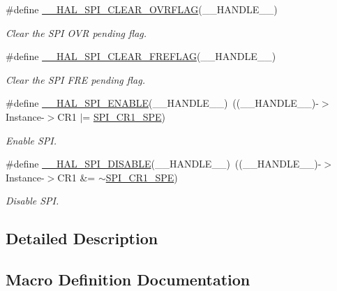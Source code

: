 \begin{DoxyCompactItemize}
\#define \hyperlink{group___s_p_i___exported___macros_gaf6af33b1c5d334b9fe7bb778c5b6442e}{\+\_\+\+\_\+\+H\+A\+L\+\_\+\+S\+P\+I\+\_\+\+C\+L\+E\+A\+R\+\_\+\+O\+V\+R\+F\+L\+AG}(\+\_\+\+\_\+\+H\+A\+N\+D\+L\+E\+\_\+\+\_\+)
\begin{DoxyCompactList}\small\item\em Clear the S\+PI O\+VR pending flag. \end{DoxyCompactList}\item 
\#define \hyperlink{group___s_p_i___exported___macros_ga7ff182f5cf6c731318c882351d6d7ac2}{\+\_\+\+\_\+\+H\+A\+L\+\_\+\+S\+P\+I\+\_\+\+C\+L\+E\+A\+R\+\_\+\+F\+R\+E\+F\+L\+AG}(\+\_\+\+\_\+\+H\+A\+N\+D\+L\+E\+\_\+\+\_\+)
\begin{DoxyCompactList}\small\item\em Clear the S\+PI F\+RE pending flag. \end{DoxyCompactList}\item 
\#define \hyperlink{group___s_p_i___exported___macros_ga16d2d73c2b16004499ae8d492e71fd4e}{\+\_\+\+\_\+\+H\+A\+L\+\_\+\+S\+P\+I\+\_\+\+E\+N\+A\+B\+LE}(\+\_\+\+\_\+\+H\+A\+N\+D\+L\+E\+\_\+\+\_\+)~((\+\_\+\+\_\+\+H\+A\+N\+D\+L\+E\+\_\+\+\_\+)-\/$>$Instance-\/$>$C\+R1 $\vert$=  \hyperlink{group___peripheral___registers___bits___definition_gac5a646d978d3b98eb7c6a5d95d75c3f9}{S\+P\+I\+\_\+\+C\+R1\+\_\+\+S\+PE})
\begin{DoxyCompactList}\small\item\em Enable S\+PI. \end{DoxyCompactList}\item 
\#define \hyperlink{group___s_p_i___exported___macros_gaa10d88f87d16de53bd81dfb33bd56959}{\+\_\+\+\_\+\+H\+A\+L\+\_\+\+S\+P\+I\+\_\+\+D\+I\+S\+A\+B\+LE}(\+\_\+\+\_\+\+H\+A\+N\+D\+L\+E\+\_\+\+\_\+)~((\+\_\+\+\_\+\+H\+A\+N\+D\+L\+E\+\_\+\+\_\+)-\/$>$Instance-\/$>$C\+R1 \&=  $\sim$\hyperlink{group___peripheral___registers___bits___definition_gac5a646d978d3b98eb7c6a5d95d75c3f9}{S\+P\+I\+\_\+\+C\+R1\+\_\+\+S\+PE})
\begin{DoxyCompactList}\small\item\em Disable S\+PI. \end{DoxyCompactList}\end{DoxyCompactItemize}


\subsection{Detailed Description}


\subsection{Macro Definition Documentation}
